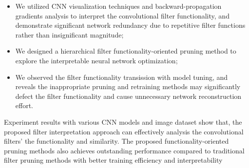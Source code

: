 \documentclass{article} %
\begin{document}
\vspace{-1mm}\begin{itemize}
	\item We utilized CNN visualization techniques and backward-propagation gradients analysis to interpret the convolutional filter functionality, and demonstrate significant network redundancy due to repetitive filter functions rather than insignificant magnitude;
	\item We designed a hierarchical filter functionality-oriented pruning method to explore the interpretable neural network optimization;
	\item We observed the filter functionality transission with model tuning, and reveals the inappropriate pruning and retraining methods may significantly defect the filter functionality and cause unnecessary network reconstruction effort.
\end{itemize}\vspace{-1mm}

Experiment results with various CNN models and image dataset show that, the proposed filter interpretation approach can effectively analysis the convolutional filters' the functionality and similarity.
	The proposed functionality-oriented pruning methods also achieves outstanding performance compared to traditional filter pruning methods with better training efficiency and interpretability

\end{document}
